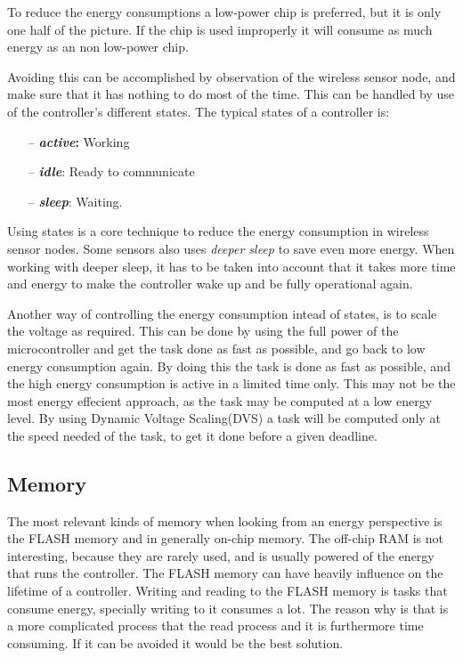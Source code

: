 To reduce the energy consumptions a low-power chip is preferred, but it is only one half of the picture. If the chip is used improperly it will consume as much energy as an non low-power chip.

Avoiding this can be accomplished by observation of the wireless sensor node, and make sure that it has nothing to do most of the time. This can be handled by use of the controller's different states. The typical states of a controller is:
\begin{itemize}
	\item[--] \textbf{\emph{active}:} Working 
	\item[--] \textbf{\emph{idle}}: Ready to communicate 
	\item[--] \textbf{\emph{sleep}}: Waiting.
\end{itemize}

Using states is a core technique to reduce the energy consumption in wireless sensor nodes. Some sensors also uses \emph{deeper sleep} to save even more energy. When working with deeper sleep, it has to be taken into account that it takes more time and energy to make the controller wake up and be fully operational again.

Another way of controlling the energy consumption intead of states, is to scale the voltage as required. This can be done by using the full power of the microcontroller and get the task done as fast as possible, and go back to low energy consumption again. By doing this the task is done as fast as possible, and the high energy consumption is active in a limited time only. This may not be the most energy effecient approach, as the task may be computed at a low energy level. By using Dynamic Voltage Scaling(DVS) a task will be computed only at the speed needed of the task, to get it done before a given deadline.

\subsection{Memory}
The most relevant kinds of memory when looking from an energy perspective is the FLASH memory and in generally on-chip memory. The off-chip RAM is not interesting, because they are rarely used, and is usually powered of the energy that runs the controller.
The FLASH memory can have heavily influence on the lifetime of a controller. Writing and reading to the FLASH memory is tasks that consume energy, specially writing to it consumes a lot. The reason why is that is a more complicated process that the read process and it is furthermore time consuming.
If it can be avoided it would be the best solution.  
 
